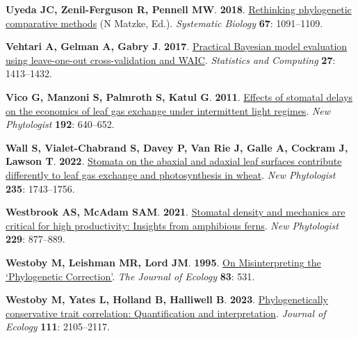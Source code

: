 \documentclass[
  letterpaper,
  DIV=11,
  numbers=noendperiod]{scrartcl}
\newlength{\cslhangindent}
\newenvironment{CSLReferences}[2] %
 {\begin{list}{}{%
  \setlength{\itemindent}{0pt}
  \setlength{\leftmargin}{0pt}
  \setlength{\parsep}{0pt}
  \ifodd #1
   \setlength{\leftmargin}{\cslhangindent}
   \setlength{\itemindent}{-1\cslhangindent}
  \fi
  \setlength{\itemsep}{#2\baselineskip}}}
 {\end{list}}
\providecommand{\DIFaddend}{} %
\DeclareRobustCommand{\DIFaddend}{\DIFOaddend \let\includegraphics\DIFOincludegraphics} %
\begin{document}
\begin{CSLReferences}{0}{1}
\DIFaddend {}
\textbf{\textbf{Uyeda JC}, \textbf{Zenil-Ferguson R}, \textbf{Pennell
MW}}. \textbf{2018}.
\href{https://doi.org/10.1093/sysbio/syy031}{Rethinking phylogenetic
comparative methods} (N Matzke, Ed.). \emph{Systematic Biology}
\textbf{67}: 1091--1109.

\textbf{\textbf{Vehtari A}, \textbf{Gelman A}, \textbf{Gabry J}}.
\textbf{2017}.
\href{https://doi.org/10.1007/s11222-016-9696-4}{Practical {Bayesian}
model evaluation using leave-one-out cross-validation and {WAIC}}.
\emph{Statistics and Computing} \textbf{27}: 1413--1432.

\textbf{\textbf{Vico G}, \textbf{Manzoni S}, \textbf{Palmroth S},
\textbf{Katul G}}. \textbf{2011}.
\href{https://doi.org/10.1111/j.1469-8137.2011.03847.x}{Effects of
stomatal delays on the economics of leaf gas exchange under intermittent
light regimes}. \emph{New Phytologist} \textbf{192}: 640--652.

\textbf{\textbf{Wall S}, \textbf{Vialet-Chabrand S}, \textbf{Davey P},
\textbf{Van Rie J}, \textbf{Galle A}, \textbf{Cockram J}, \textbf{Lawson
T}}. \textbf{2022}. \href{https://doi.org/10.1111/nph.18257}{Stomata on
the abaxial and adaxial leaf surfaces contribute differently to leaf gas
exchange and photosynthesis in wheat}. \emph{New Phytologist}
\textbf{235}: 1743--1756.

\textbf{\textbf{Westbrook AS}, \textbf{McAdam SAM}}. \textbf{2021}.
\href{https://doi.org/10.1111/nph.16850}{Stomatal density and mechanics
are critical for high productivity: Insights from amphibious ferns}.
\emph{New Phytologist} \textbf{229}: 877--889.

\textbf{\textbf{Westoby M}, \textbf{Leishman MR}, \textbf{Lord JM}}.
\textbf{1995}. \href{https://doi.org/10.2307/2261605}{On
{Misinterpreting} the {`{Phylogenetic Correction}'}}. \emph{The Journal
of Ecology} \textbf{83}: 531.

\textbf{\textbf{Westoby M}, \textbf{Yates L}, \textbf{Holland B},
\textbf{Halliwell B}}. \textbf{2023}.
\href{https://doi.org/10.1111/1365-2745.14150}{Phylogenetically
conservative trait correlation: {Quantification} and interpretation}.
\emph{Journal of Ecology} \textbf{111}: 2105--2117.


\end{CSLReferences}
\end{document}
